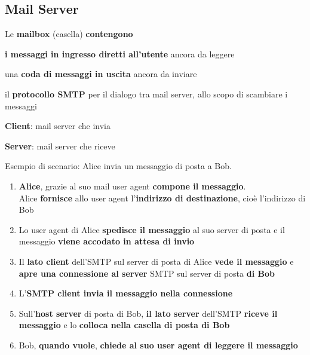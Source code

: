 \documentclass[10pt]{article}
\begin{document}
\subsection{Mail Server}
Le \textbf{mailbox} (casella) \textbf{contengono}
\begin{list}{}{}
\item \textbf{i messaggi in ingresso diretti all'utente} ancora da leggere
\item una \textbf{coda di messaggi in uscita} ancora da inviare
\item il \textbf{protocollo SMTP} per il dialogo tra mail server, allo scopo di scambiare i messaggi
\begin{list}{}{}
\item \textbf{Client}: mail server che invia
\item \textbf{Server}: mail server che riceve
\end{list}
\end{list}
Esempio di scenario: Alice invia un messaggio di posta a Bob.
\begin{enumerate}
\item \textbf{Alice}, grazie al suo mail user agent \textbf{compone il messaggio}.\\Alice \textbf{fornisce} allo user agent l'\textbf{indirizzo di destinazione}, cioè l'indirizzo di Bob
\item Lo user agent di Alice \textbf{spedisce il messaggio} al suo server di posta e il messaggio \textbf{viene accodato in attesa di invio}
\item Il \textbf{lato client} dell'SMTP sul server di posta di Alice \textbf{vede il messaggio} e \textbf{apre una connessione al server} SMTP sul server di posta \textbf{di Bob}
\item L'\textbf{SMTP client invia il messaggio nella connessione}
\item Sull'\textbf{host server} di posta di Bob, \textbf{il lato server} dell'SMTP \textbf{riceve il messaggio} e lo \textbf{colloca nella casella di posta di Bob}
\item Bob, \textbf{quando vuole}, \textbf{chiede al suo user agent di leggere il messaggio}
\end{enumerate}
\pagebreak
\end{document}
